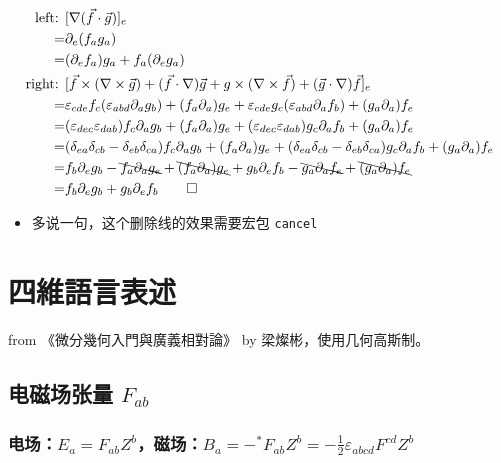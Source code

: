 \documentclass{article}
\begin{document}
$$\begin{aligned}
    \text{left: } & [\nabla(\vec{f}\cdot\vec{g})]_{e}\\
    =&\partial_{e}(f_ag_a)\\
    =&(\partial_{e}f_{a})g_{a}+f_{a}(\partial_{e}g_{a})\\
    \text{right: } & [\vec{f}\times(\nabla\times\vec{g})+(\vec{f}\cdot\nabla)\vec{g}+g\times(\nabla\times\vec{f})+(\vec{g}\cdot\nabla)\vec{f}]_{e}\\
    =&\varepsilon_{cde}f_{c}(\varepsilon_{abd}\partial_{a}g_{b})+(f_{a}\partial_{a})g_{e}+\varepsilon_{cde}g_{c}(\varepsilon_{abd}\partial_{a}f_{b})+(g_{a}\partial_{a})f_{e}\\
    =&(\varepsilon_{dec}\varepsilon_{dab})f_{c}\partial_{a}g_{b}+(f_{a}\partial_{a})g_{e}+(\varepsilon_{dec}\varepsilon_{dab})g_{c}\partial_{a}f_{b}+(g_{a}\partial_{a})f_{e}\\
    =&(\delta_{ea}\delta_{cb}-\delta_{eb}\delta_{ca})f_{c}\partial_{a}g_{b}+(f_{a}\partial_{a})g_{e}+(\delta_{ea}\delta_{cb}-\delta_{eb}\delta_{ca})g_{c}\partial_{a}f_{b}+(g_{a}\partial_{a})f_{e}\\
    =&f_{b}\partial_{e}g_{b}-\bcancel{f_{a}\partial_{a}g_{e}}+\bcancel{(f_{a}\partial_{a})g_{e}}+g_{b}\partial_{e}f_{b}-\bcancel{g_{a}\partial_{a}f_{e}}+\bcancel{(g_{a}\partial_{a})f_{e}}\\
    =&f_{b}\partial_{e}g_{b}+g_{b}\partial_{e}f_{b}\qquad\square
\end{aligned}$$

\begin{itemize}
    \item 多说一句，这个删除线的效果需要宏包 \texttt{cancel}
\end{itemize}

\section{四維語言表述}

from 《微分幾何入門與廣義相對論》 by 梁燦彬，使用几何高斯制。

\subsection{电磁场张量 $F_{ab}$}

\subsubsection{电场：$E_{a}=F_{ab}Z^b$，磁场：$B_a=-^*F_{ab}Z^b=-\frac{1}{2}\varepsilon_{abcd}F^{cd}Z^b$}
\end{document}
